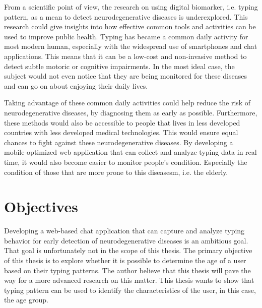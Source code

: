 From a scientific point of view, the research on using digital biomarker, i.e. typing pattern, as a mean to detect neurodegenerative diseases is underexplored.
This research could give insights into how effective common tools and activities can be used to improve public health.
Typing has became a common daily activity for most modern human, especially with the widespread use of smartphones and chat applications.
This means that it can be a low-cost and non-invasive method to detect subtle motoric or cognitive impairments.
In the most ideal case, the subject would not even notice that they are being monitored for these diseases and can go on about enjoying their daily lives.

Taking advantage of these common daily activities could help reduce the risk of neurodegenerative diseases, by diagnosing them as early as possible.
Furthermore, these methods would also be accessible to people that lives in less developed countries with less developed medical technologies.
This would ensure equal chances to fight against these neurodegenerative diseases.
By developing a mobile-optimized web application that can collect and analyze typing data in real time, it would also become easier to monitor people's condition.
Especially the condition of those that are more prone to this diseasesm, i.e. the elderly.

\section{Objectives}


Developing a web-based chat application that can capture and analyze typing behavior for early detection of neurodegenerative diseases is an ambitious goal.
That goal is unfortunately not in the scope of this thesis.
The primary objective of this thesis is to explore whether it is possible to determine the age of a user based on their typing patterns.
The author believe that this thesis will pave the way for a more advanced research on this matter.
This thesis wants to show that typing pattern can be used to identify the characteristics of the user, in this case, the age group.

